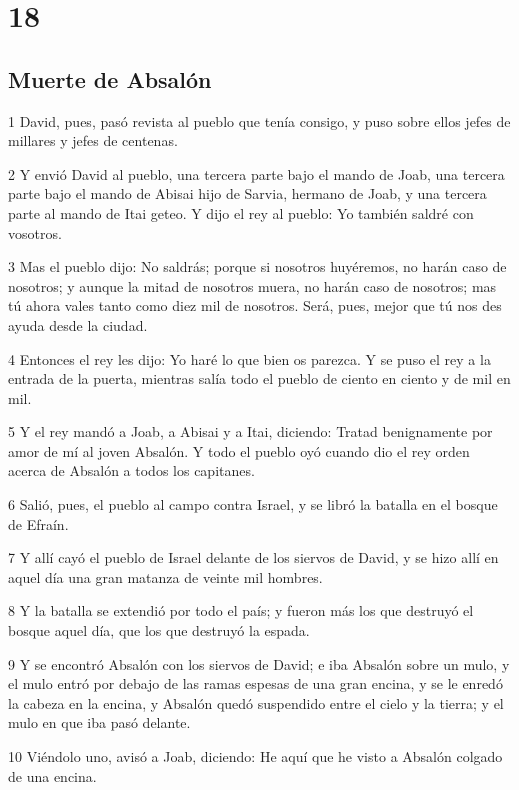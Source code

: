 \chapter{18}

\section*{Muerte de Absalón}

\par 1 David, pues, pasó revista al pueblo que tenía consigo, y puso sobre ellos jefes de millares y jefes de centenas.
\par 2 Y envió David al pueblo, una tercera parte bajo el mando de Joab, una tercera parte bajo el mando de Abisai hijo de Sarvia, hermano de Joab, y una tercera parte al mando de Itai geteo. Y dijo el rey al pueblo: Yo también saldré con vosotros.
\par 3 Mas el pueblo dijo: No saldrás; porque si nosotros huyéremos, no harán caso de nosotros; y aunque la mitad de nosotros muera, no harán caso de nosotros; mas tú ahora vales tanto como diez mil de nosotros. Será, pues, mejor que tú nos des ayuda desde la ciudad.
\par 4 Entonces el rey les dijo: Yo haré lo que bien os parezca. Y se puso el rey a la entrada de la puerta, mientras salía todo el pueblo de ciento en ciento y de mil en mil.
\par 5 Y el rey mandó a Joab, a Abisai y a Itai, diciendo: Tratad benignamente por amor de mí al joven Absalón. Y todo el pueblo oyó cuando dio el rey orden acerca de Absalón a todos los capitanes.
\par 6 Salió, pues, el pueblo al campo contra Israel, y se libró la batalla en el bosque de Efraín.
\par 7 Y allí cayó el pueblo de Israel delante de los siervos de David, y se hizo allí en aquel día una gran matanza de veinte mil hombres.
\par 8 Y la batalla se extendió por todo el país; y fueron más los que destruyó el bosque aquel día, que los que destruyó la espada.
\par 9 Y se encontró Absalón con los siervos de David; e iba Absalón sobre un mulo, y el mulo entró por debajo de las ramas espesas de una gran encina, y se le enredó la cabeza en la encina, y Absalón quedó suspendido entre el cielo y la tierra; y el mulo en que iba pasó delante.
\par 10 Viéndolo uno, avisó a Joab, diciendo: He aquí que he visto a Absalón colgado de una encina.
